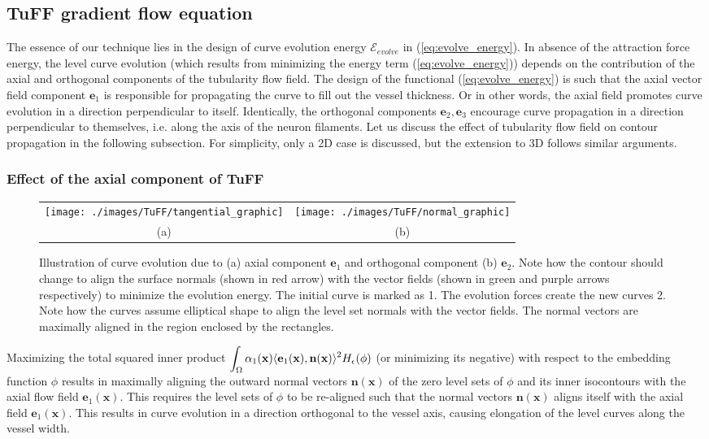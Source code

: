 \subsection{TuFF gradient flow equation}
The essence of our technique lies in the design of curve evolution energy $\mathcal{E}_{evolve}$ in (\ref{eq:evolve_energy}). In absence of the attraction force energy, the level curve evolution (which results from minimizing the energy term (\ref{eq:evolve_energy})) depends on the contribution of the axial and orthogonal components of the tubularity flow field. The design of the functional (\ref{eq:evolve_energy}) is such that the axial vector field component $\textbf{e}_1$ is responsible for propagating the curve to fill out the vessel thickness. Or in other words, the axial field promotes curve evolution in a direction perpendicular to itself. Identically, the orthogonal components $\textbf{e}_2,\textbf{e}_3$ encourage curve propagation in a direction perpendicular to themselves, i.e. along the axis of the neuron filaments. Let us discuss the effect of tubularity flow field on contour propagation in the following subsection. For simplicity, only a 2D case is discussed, but the extension to 3D follows similar arguments.

\subsubsection{Effect of the axial component of TuFF}
\begin{figure}[t]
\renewcommand{\tabcolsep}{0.05cm}
\begin{tabular}{cc}
	\texttt{[image: ./images/TuFF/tangential\_graphic]}
	&\texttt{[image: ./images/TuFF/normal\_graphic]}
	\\
	\scriptsize (a) & \scriptsize (b) 
\end{tabular}
\caption[Graphic illustration of TuFF]{ Illustration of curve evolution due to (a) axial component $\textbf{e}_1$ and orthogonal component (b) $\textbf{e}_2$. Note how the contour should change to align the surface normals (shown in red arrow) with the vector fields (shown in green and purple arrows respectively) to minimize the evolution energy. The initial curve is marked as 1. The evolution forces create the new curves 2. Note how the curves assume elliptical shape to align the level set normals with the vector fields. The normal vectors are maximally aligned in the region enclosed by the rectangles.}
\label{fig:evolve_graphic}
\end{figure}
Maximizing the total squared inner product 
$\displaystyle \int_{\Omega}\alpha_1(\textbf{x})\langle \textbf{e}_1(\textbf{x}),\textbf{n}(\textbf{x})\rangle^2H_{\epsilon}(\phi)$ 
(or minimizing its negative) with respect to the embedding function $\phi$ results in maximally aligning the  outward normal vectors $\textbf{n}(\textbf{x})$ of the zero level sets of $\phi$ and its inner isocontours  with the axial flow field $\textbf{e}_1(\textbf{x})$. This requires the level sets of $\phi$ to be re-aligned such that the normal vectors $\textbf{n}(\textbf{x})$ aligns itself with the axial field $\textbf{e}_1(\textbf{x})$. This results in curve evolution in a direction orthogonal to the vessel axis, causing elongation of the level curves along the vessel width. 

